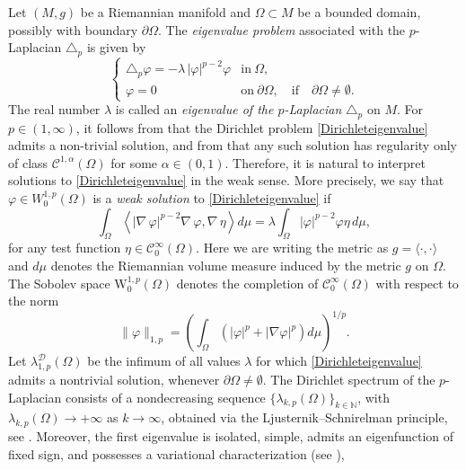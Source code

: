 \documentclass{article}
\newcommand{\grad}{\nabla\,}
\begin{document}
Let $(M,g)$ be a Riemannian manifold and $\Omega \subset M$ be a bounded domain, possibly with boundary $\partial \Omega$. The \emph{eigenvalue problem} associated with the
$p$-Laplacian $\triangle_p$ is given by
\begin{equation}\label{Dirichleteigenvalue}
\begin{cases}
\triangle_p \varphi = -\lambda\,|\varphi|^{p-2}\varphi 
& \text{in} \ \Omega,\\
\varphi = 0 
& \text{on} \ \partial\Omega, \quad \text{if} \quad \partial \Omega \neq \emptyset.
\end{cases}
\end{equation}
The real number $\lambda$ is called an \emph{eigenvalue of the $p$-Laplacian} $\triangle_p$ on $M$. For $p \in (1,\infty)$, it follows from \cite{lindqvist} that the Dirichlet problem
\eqref{Dirichleteigenvalue} admits a non-trivial solution, and from \cite[Theorem 4.5]{le} that any such
solution has regularity only of class $\mathcal{C}^{1,\alpha}(\Omega)$ for some
$\alpha \in (0,1)$. Therefore, it is natural to interpret solutions to \eqref{Dirichleteigenvalue} in the weak sense. More precisely, we say that $\varphi \in W^{1,p}_0(\Omega)$ is a \emph{weak solution} to \eqref{Dirichleteigenvalue} if
\begin{equation}\label{eqweak}
\int_{\Omega} \left\langle |\grad\varphi |^{p-2} \grad \varphi, \grad \eta \right\rangle d\mu = \lambda \int_{\Omega} | \varphi |^{p-2} \varphi \eta \, d\mu,  
\end{equation}
for any test function $\eta \in \mathcal{C}_0^{\infty}(\Omega)$. Here we are writing the metric as $g = \langle \cdot , \cdot \rangle$ and  $d\mu$ denotes the Riemannian volume measure induced by the metric $g$ on $\Omega$. The Sobolev space $\mathrm{W}^{1,p}_0(\Omega)$ denotes the completion of $\mathcal{C}_0^{\infty}(\Omega)$ with respect to the norm 
\begin{equation*}
    \| \varphi \|_{1,p} = \left( \int_{\Omega} \left( |\varphi|^p + |\nabla \varphi|^p \right) d\mu \right)^{1/p}.
\end{equation*}
Let $\lambda_{1,p}^{\mathcal{D}}(\Omega)$ be the infimum of all values $\lambda$ for which \eqref{Dirichleteigenvalue} admits a nontrivial solution, whenever $\partial \Omega \neq \emptyset$. The Dirichlet spectrum of the $p$-Laplacian consists of a nondecreasing sequence $\{\lambda_{k,p}(\Omega)\}_{k \in \mathbb{N}}$, with $\lambda_{k,p}(\Omega) \to +\infty$ as $k \to \infty$, obtained via the Ljusternik--Schnirelman principle, see   \cite{garzia-peral}. Moreover, the first eigenvalue is isolated,  simple,   admits an eigenfunction of fixed sign, and possesses a variational characterization (see \cite{anane, lindqvist}),
\end{document}

